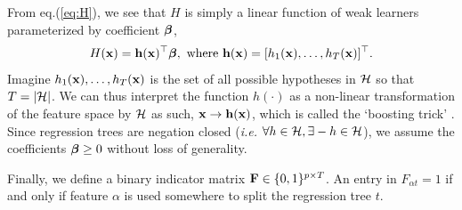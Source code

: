 From eq.(\ref{eq:H}), we see that $H$ is simply a linear function of weak learners parameterized by coefficient $\boldsymbol{\beta}$, 
\begin{align}
H(\mathbf{x}) = \mathbf{h}(\mathbf{x})^\top\boldsymbol{\beta}, \textrm{ where }\mathbf{h}(\mathbf{x}) = [h_1(\mathbf{x}),\dots,h_T(\mathbf{x})]^\top. \label{eq:boosting-trick}
\end{align}
Imagine $h_1(\mathbf{x}),\dots,h_T(\mathbf{x})$ is the set of all possible hypotheses in ${\cal H}$ so that $T = |{\cal H}|$. We can thus interpret the function $h(\cdot)$ as a non-linear transformation of the feature space by ${\cal H}$ as such, $\mathbf{x} \rightarrow \mathbf{h}(\mathbf{x})$, which is called the `boosting trick' \citep{friedman2001greedy,chapelle2011boosted,rosset2004boosting}. Since regression trees are negation closed (\emph{i.e.} $\forall h \in {\cal H}, \exists -h \in {\cal H}$), we assume the coefficients $\boldsymbol{\beta} \ge 0$ without loss of generality. 

Finally, we define a binary indicator matrix $\mathbf{F} \in \{0,1\}^{p \times T}$. An entry in $F_{\alpha t} = 1$ if and only if feature $\alpha$ is used somewhere to split the regression tree $t$.